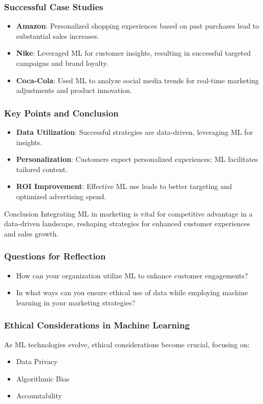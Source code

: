 \documentclass[aspectratio=169]{beamer}
\begin{document}
\begin{frame}[fragile]
    \frametitle{Successful Case Studies}
    \begin{itemize}
        \item \textbf{Amazon}: Personalized shopping experiences based on past purchases lead to substantial sales increases.
        \item \textbf{Nike}: Leveraged ML for customer insights, resulting in successful targeted campaigns and brand loyalty.
        \item \textbf{Coca-Cola}: Used ML to analyze social media trends for real-time marketing adjustments and product innovation.
    \end{itemize}
\end{frame}

\begin{frame}[fragile]
    \frametitle{Key Points and Conclusion}
    \begin{itemize}
        \item \textbf{Data Utilization}: Successful strategies are data-driven, leveraging ML for insights.
        \item \textbf{Personalization}: Customers expect personalized experiences; ML facilitates tailored content.
        \item \textbf{ROI Improvement}: Effective ML use leads to better targeting and optimized advertising spend.
    \end{itemize}
    \begin{block}{Conclusion}
        Integrating ML in marketing is vital for competitive advantage in a data-driven landscape, reshaping strategies for enhanced customer experiences and sales growth.
    \end{block}
\end{frame}

\begin{frame}[fragile]
    \frametitle{Questions for Reflection}
    \begin{itemize}
        \item How can your organization utilize ML to enhance customer engagements?
        \item In what ways can you ensure ethical use of data while employing machine learning in your marketing strategies?
    \end{itemize}
\end{frame}

\begin{frame}[fragile]
    \frametitle{Ethical Considerations in Machine Learning}
    As ML technologies evolve, ethical considerations become crucial, focusing on:
    \begin{itemize}
        \item Data Privacy
        \item Algorithmic Bias
        \item Accountability
    \end{itemize}
\end{frame}
\end{document}
